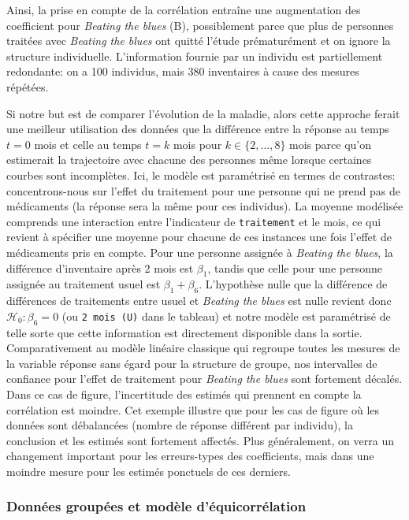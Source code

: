 \documentclass[
  11pt,
  letterpaper,
]{article}
\theoremstyle{definition}
\theoremstyle{definition}
\theoremstyle{definition}
\theoremstyle{definition}
\theoremstyle{remark}
\begin{document}
Ainsi, la prise en compte de la corrélation entraîne une augmentation des coefficient pour \emph{Beating the blues} (B), possiblement parce que plus de personnes traitées avec \emph{Beating the blues} ont quitté l'étude prématurément et on ignore la structure individuelle. L'information fournie par un individu est partiellement redondante: on a 100 individus, mais 380 inventaires à cause des mesures répétées.

Si notre but est de comparer l'évolution de la maladie, alors cette approche ferait une meilleur utilisation des données que la différence entre la réponse au temps \(t=0\) mois et celle au temps \(t=k\) mois pour \(k \in \{2, \ldots, 8\}\) mois parce qu'on estimerait la trajectoire avec chacune des personnes même lorsque certaines courbes sont incomplètes. Ici, le modèle est paramétrisé en termes de contrastes: concentrons-nous sur l'effet du traitement pour une personne qui ne prend pas de médicaments (la réponse sera la même pour ces individus). La moyenne modélisée comprends une interaction entre l'indicateur de \texttt{traitement} et le mois, ce qui revient à spécifier une moyenne pour chacune de ces instances une fois l'effet de médicaments pris en compte. Pour une personne assignée à \emph{Beating the blues}, la différence d'inventaire après 2 mois est \(\beta_1\), tandis que celle pour une personne assignée au traitement usuel est \(\beta_1 + \beta_6\). L'hypothèse nulle que la différence de différences de traitements entre usuel et \emph{Beating the blues} est nulle revient donc \(\mathscr{H}_0: \beta_6=0\) (ou \texttt{2\ mois\ (U)} dans le tableau) et notre modèle est paramétrisé de telle sorte que cette information est directement disponible dans la sortie. Comparativement au modèle linéaire classique qui regroupe toutes les mesures de la variable réponse sans égard pour la structure de groupe, nos intervalles de confiance pour l'effet de traitement pour \emph{Beating the blues} sont fortement décalés. Dans ce cas de figure, l'incertitude des estimés qui prennent en compte la corrélation est moindre. Cet exemple illustre que pour les cas de figure où les données sont débalancées (nombre de réponse différent par individu), la conclusion et les estimés sont fortement affectés. Plus généralement, on verra un changement important pour les erreurs-types des coefficients, mais dans une moindre mesure pour les estimés ponctuels de ces derniers.

\hypertarget{donnuxe9es-groupuxe9es-et-moduxe8le-duxe9quicorruxe9lation}{%
\subsubsection{Données groupées et modèle d'équicorrélation}\label{donnuxe9es-groupuxe9es-et-moduxe8le-duxe9quicorruxe9lation}}
\end{document}
